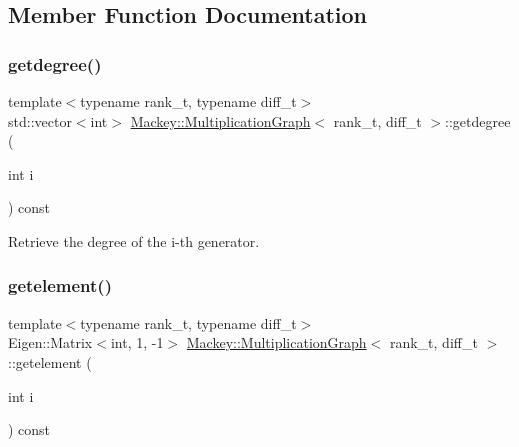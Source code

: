 \subsection{Member Function Documentation}
\mbox{\label{classMackey_1_1MultiplicationGraph_a1616acd79b92c94994648835a7941753}} 
\subsubsection{\texorpdfstring{getdegree()}{getdegree()}}
{\footnotesize\ttfamily template$<$typename rank\+\_\+t, typename diff\+\_\+t$>$ \\
std\+::vector$<$int$>$ \hyperlink{classMackey_1_1MultiplicationGraph}{Mackey\+::\+Multiplication\+Graph}$<$ rank\+\_\+t, diff\+\_\+t $>$\+::getdegree (\begin{DoxyParamCaption}\item[{int}]{i }\end{DoxyParamCaption}) const\hspace{0.3cm}{\ttfamily [inline]}}



Retrieve the degree of the i-\/th generator. 

\mbox{\label{classMackey_1_1MultiplicationGraph_acb5d06dd354041e4726a5aea5e11e847}} 
\subsubsection{\texorpdfstring{getelement()}{getelement()}}
{\footnotesize\ttfamily template$<$typename rank\+\_\+t, typename diff\+\_\+t$>$ \\
Eigen\+::\+Matrix$<$int, 1, -\/1$>$ \hyperlink{classMackey_1_1MultiplicationGraph}{Mackey\+::\+Multiplication\+Graph}$<$ rank\+\_\+t, diff\+\_\+t $>$\+::getelement (\begin{DoxyParamCaption}\item[{int}]{i }\end{DoxyParamCaption}) const\hspace{0.3cm}{\ttfamily [inline]}}




